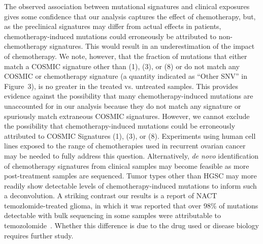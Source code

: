 \documentclass[linenumbers]{bmcart}
\begin{document}
The observed association between mutational signatures and clinical exposures gives some confidence that our analysis captures the effect of chemotherapy, but, as the preclinical signatures may differ from actual effects in patients, chemotherapy-induced mutations could erroneously be attributed to non-chemotherapy signatures. This would result in an underestimation of the impact of chemotherapy. We note, however, that the fraction of mutations that either match a COSMIC signature other than (1), (3), or (8) or do not match any COSMIC or chemotherapy signature (a quantity indicated as ``Other SNV'' in Figure~3), is no greater in the treated vs. untreated samples. This provides evidence against the possibility that many chemotherapy-induced mutations are unaccounted for in our analysis because they do not match any signature or spuriously match extraneous COSMIC signatures. However, we cannot exclude the possibility that chemotherapy-induced mutations could be erroneously attributed to COSMIC Signatures (1), (3), or (8). Experiments using human cell lines exposed to the range of chemotherapies used in recurrent ovarian cancer may be needed to fully address this question. Alternatively, \textit{de novo} identification of chemotherapy signatures from clinical samples may become feasible as more post-treatment samples are sequenced. Tumor types other than HGSC may more readily show detectable levels of chemotherapy-induced mutations to inform such a deconvolution. A striking contrast our results is a report of NACT temozlomide-treated glioma, in which it was reported that over 98\% of mutations detectable with bulk sequencing in some samples were attributable to temozolomide~\cite{Johnson_2013}. Whether this difference is due to the drug used or disease biology requires further study.


\end{document}

